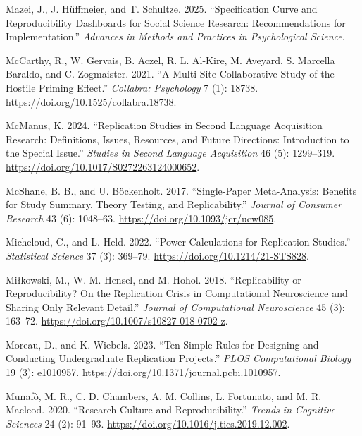 \documentclass[
  letterpaper,
  DIV=11,
  openany,
  fontsize=12pt,
  parskip=half,
  headings=big,
  numbers=noenddot,
  titlepage=false]{scrreprt}
\newlength{\cslhangindent}
\newenvironment{CSLReferences}[2] %
 {\begin{list}{}{%
  \setlength{\itemindent}{0pt}
  \setlength{\leftmargin}{0pt}
  \setlength{\parsep}{0pt}
  \ifodd #1
   \setlength{\leftmargin}{\cslhangindent}
   \setlength{\itemindent}{-1\cslhangindent}
  \fi
  \setlength{\itemsep}{#2\baselineskip}}}
 {\end{list}}
\begin{document}
\begin{CSLReferences}{1}{0}
Mazei, J., J. Hüffmeier, and T. Schultze. 2025. {``Specification Curve
and Reproducibility Dashboards for Social Science Research:
Recommendations for Implementation.''} \emph{Advances in Methods and
Practices in Psychological Science}.

McCarthy, R., W. Gervais, B. Aczel, R. L. Al-Kire, M. Aveyard, S.
Marcella Baraldo, and C. Zogmaister. 2021. {``A Multi-Site Collaborative
Study of the Hostile Priming Effect.''} \emph{Collabra: Psychology} 7
(1): 18738. \url{https://doi.org/10.1525/collabra.18738}.

McManus, K. 2024. {``Replication Studies in Second Language Acquisition
Research: Definitions, Issues, Resources, and Future Directions:
Introduction to the Special Issue.''} \emph{Studies in Second Language
Acquisition} 46 (5): 1299--319.
\url{https://doi.org/10.1017/S0272263124000652}.

McShane, B. B., and U. Böckenholt. 2017. {``Single-Paper Meta-Analysis:
Benefits for Study Summary, Theory Testing, and Replicability.''}
\emph{Journal of Consumer Research} 43 (6): 1048--63.
\url{https://doi.org/10.1093/jcr/ucw085}.

Micheloud, C., and L. Held. 2022. {``Power Calculations for Replication
Studies.''} \emph{Statistical Science} 37 (3): 369--79.
\url{https://doi.org/10.1214/21-STS828}.

Miłkowski, M., W. M. Hensel, and M. Hohol. 2018. {``Replicability or
Reproducibility? On the Replication Crisis in Computational Neuroscience
and Sharing Only Relevant Detail.''} \emph{Journal of Computational
Neuroscience} 45 (3): 163--72.
\url{https://doi.org/10.1007/s10827-018-0702-z}.

Moreau, D., and K. Wiebels. 2023. {``Ten Simple Rules for Designing and
Conducting Undergraduate Replication Projects.''} \emph{PLOS
Computational Biology} 19 (3): e1010957.
\url{https://doi.org/10.1371/journal.pcbi.1010957}.

Munafò, M. R., C. D. Chambers, A. M. Collins, L. Fortunato, and M. R.
Macleod. 2020. {``Research Culture and Reproducibility.''} \emph{Trends
in Cognitive Sciences} 24 (2): 91--93.
\url{https://doi.org/10.1016/j.tics.2019.12.002}.


\end{CSLReferences}
\end{document}

